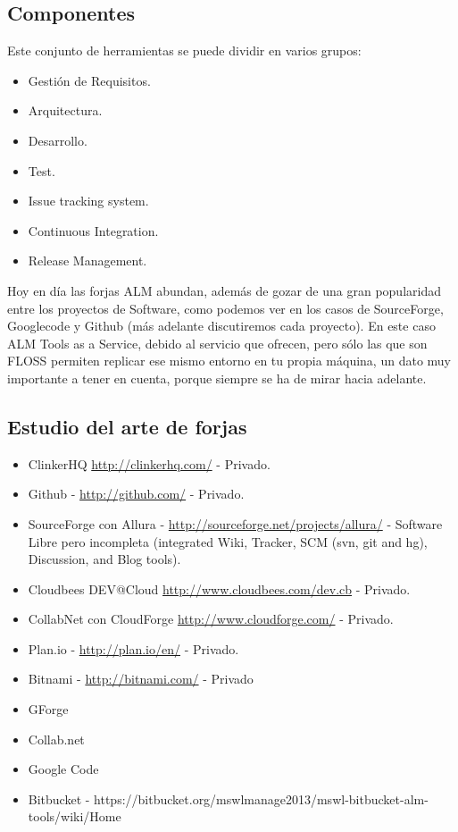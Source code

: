 \subsection{Componentes}
\label{sub:componentes}

\par Este conjunto de herramientas se puede dividir en varios grupos:

\begin{itemize}
	\item Gesti\'on de Requisitos.
	\item Arquitectura.
	\item Desarrollo.
	\item Test.
	\item Issue tracking system.
	\item Continuous Integration.
	\item Release Management.
\end{itemize}

\par Hoy en d\'ia las forjas ALM abundan, adem\'as de gozar de una gran popularidad entre los proyectos de Software, como podemos ver en los casos de SourceForge, Googlecode y Github (más adelante discutiremos cada proyecto). En este caso ALM Tools as a Service, debido al servicio que ofrecen, pero sólo las que son FLOSS permiten replicar ese mismo entorno en tu propia máquina, un dato muy importante a tener en cuenta, porque siempre se ha de mirar hacia adelante.


\subsection{Estudio del arte de forjas}
\label{sub:estado-del-arte}

\begin{itemize}
	\item ClinkerHQ \url{http://clinkerhq.com/} - Privado.
	\item Github - \url{http://github.com/} - Privado.
	\item SourceForge con Allura - \url{http://sourceforge.net/projects/allura/} - Software Libre pero incompleta (integrated Wiki, Tracker, SCM (svn, git and hg), Discussion, and Blog tools).
	\item Cloudbees DEV@Cloud \url{http://www.cloudbees.com/dev.cb} - Privado.
	\item CollabNet con CloudForge \url{http://www.cloudforge.com/} - Privado.
	\item Plan.io - \url{http://plan.io/en/} - Privado.
	\item Bitnami - \url{http://bitnami.com/} - Privado
	\item GForge
	\item Collab.net
	\item Google Code
	\item Bitbucket - https://bitbucket.org/mswlmanage2013/mswl-bitbucket-alm-tools/wiki/Home
\end{itemize}

